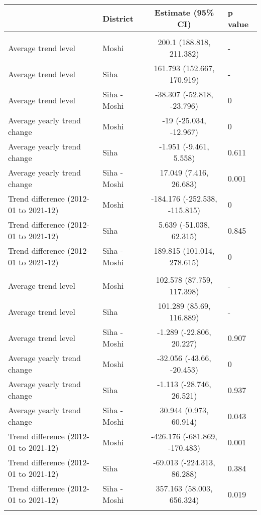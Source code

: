 \begin{longtable}{l|lcl}
\toprule
\multicolumn{1}{l}{} & District & Estimate (95\% CI) & p value \\ 
\midrule\addlinespace[2.5pt]
\multicolumn{4}{l}{Bronchial Asthma} \\ 
\midrule\addlinespace[2.5pt]
Average trend level & Moshi & 200.1 (188.818, 211.382) & - \\ 
Average trend level & Siha & 161.793 (152.667, 170.919) & - \\ 
Average trend level & Siha - Moshi & -38.307 (-52.818, -23.796) & 0 \\ 
Average yearly trend change & Moshi & -19 (-25.034, -12.967) & 0 \\ 
Average yearly trend change & Siha & -1.951 (-9.461, 5.558) & 0.611 \\ 
Average yearly trend change & Siha - Moshi & 17.049 (7.416, 26.683) & 0.001 \\ 
Trend difference (2012-01 to 2021-12) & Moshi & -184.176 (-252.538, -115.815) & 0 \\ 
Trend difference (2012-01 to 2021-12) & Siha & 5.639 (-51.038, 62.315) & 0.845 \\ 
Trend difference (2012-01 to 2021-12) & Siha - Moshi & 189.815 (101.014, 278.615) & 0 \\ 
\midrule\addlinespace[2.5pt]
\multicolumn{4}{l}{Caries} \\ 
\midrule\addlinespace[2.5pt]
Average trend level & Moshi & 102.578 (87.759, 117.398) & - \\ 
Average trend level & Siha & 101.289 (85.69, 116.889) & - \\ 
Average trend level & Siha - Moshi & -1.289 (-22.806, 20.227) & 0.907 \\ 
Average yearly trend change & Moshi & -32.056 (-43.66, -20.453) & 0 \\ 
Average yearly trend change & Siha & -1.113 (-28.746, 26.521) & 0.937 \\ 
Average yearly trend change & Siha - Moshi & 30.944 (0.973, 60.914) & 0.043 \\ 
Trend difference (2012-01 to 2021-12) & Moshi & -426.176 (-681.869, -170.483) & 0.001 \\ 
Trend difference (2012-01 to 2021-12) & Siha & -69.013 (-224.313, 86.288) & 0.384 \\ 
Trend difference (2012-01 to 2021-12) & Siha - Moshi & 357.163 (58.003, 656.324) & 0.019 \\ 
\midrule\addlinespace[2.5pt]
\multicolumn{4}{l}{Diabetes Mellitus} \\ 

\end{longtable}
